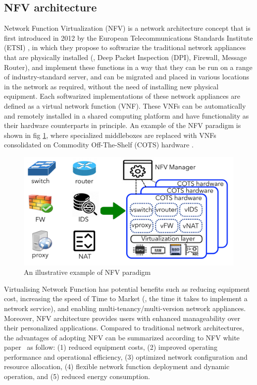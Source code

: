 \subsection{NFV architecture}
Network Function Virtualization (NFV) is a network architecture concept that is first introduced in 2012 by the European Telecommunications Standards Institute (ETSI) \cite{nfv_wp}, in which they propose to softwarize the traditional network appliances that are physically installed (\eg, Deep Packet Inspection (DPI), Firewall, Message Router), and implement these functions in a way that they can be run on a range of industry-standard server, and can be migrated and placed in various locations in the network as required, without the need of installing new physical equipment. Each softwarized implementations of these network appliances are defined as a virtual network function (VNF). These VNFs can be automatically and remotely installed in a shared computing platform and have functionality as their hardware counterparts in principle.
An example of the NFV paradigm is shown in fig \ref{fig:NFVenvironment}, where  specialized middleboxes are replaced with VNFs consolidated on Commodity Off-The-Shelf (COTS) hardware \cite{zhang2020nfv}.
\begin{figure}
	\centering
	\includegraphics[width=0.9\linewidth]{figs/NFVenvironment.PNG}
		\vspace{\baselineskip}
	\caption{An illustrative example of NFV paradigm \cite{zhang2020nfv}}
	\label{fig:NFVenvironment}
\end{figure}
Virtualising Network Function has potential benefits such as reducing equipment cost, increasing the speed of Time to Market (\ie, the time it takes to implement a network service), and enabling multi-tenancy/multi-version network appliances. Moreover, NFV architecture provides users with enhanced manageability over their personalized applications. 
Compared to traditional network architectures, the advantages of adopting NFV can be summarized according to NFV white paper~\cite{nfv_wp} as follow:
(1) reduced equipment costs, 
(2) improved operating performance and operational efficiency,
(3) optimized network configuration and resource allocation,
(4) flexible network function deployment and dynamic operation, and (5) reduced energy consumption.

